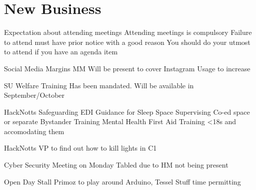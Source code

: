 \documentclass[11pt,hacksoc]{meetingmins}
\begin{document}
\section{New Business}
\begin{items}
  \item Expectation about attending meetings
    \subitem Attending meetings is compulsory
    \subitem Failure to attend must have prior notice with a good reason
    \subitem You should do your utmost to attend if you have an agenda item
  \item Social Media
    \subitem Margins
      \subsubitem MM Will be present to cover
    \subitem Instagram
      \subsubitem Usage to increase
  \item SU Welfare Training
    \subitem Has been mandated. Will be available in September/October
  \item HackNotts Safeguarding EDI
    \subitem Guidance for Sleep Space
      \subsubitem Supervising
      \subsubitem Co-ed space or separate
    \subitem Bystander Training
    \subitem Mental Health First Aid Training
    \subitem <18s and accomodating them
  \item HackNotts
    \subitem VP to find out how to kill lights in C1
  \item Cyber Security Meeting on Monday
    \subitem Tabled due to HM not being present
  \item Open Day Stall
    \subitem Primoz to play around Arduino, Tessel Stuff time permitting
\end{items}

\vspace{1em}
\end{document}
